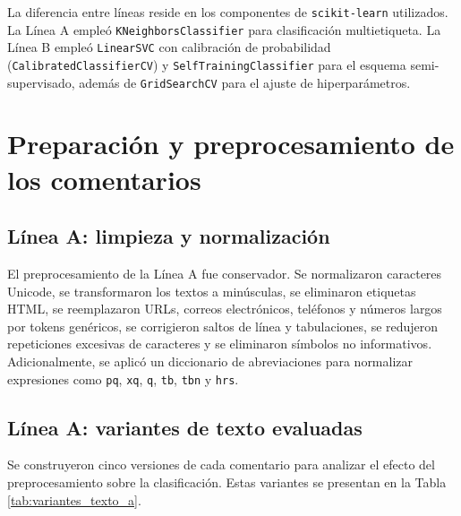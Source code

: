 \documentclass[12pt,a4paper]{article}
\newcommand{\code}[1]{\nolinkurl{#1}}
\begin{document}
La diferencia entre líneas reside en los componentes de \code{scikit-learn} utilizados. La Línea A empleó \code{KNeighborsClassifier} para clasificación multietiqueta. La Línea B empleó \code{LinearSVC} con calibración de probabilidad (\code{CalibratedClassifierCV}) y \code{SelfTrainingClassifier} para el esquema semi-supervisado, además de \code{GridSearchCV} para el ajuste de hiperparámetros.

\section{Preparación y preprocesamiento de los comentarios}

\subsection{Línea A: limpieza y normalización}

El preprocesamiento de la Línea A fue conservador. Se normalizaron caracteres Unicode, se transformaron los textos a minúsculas, se eliminaron etiquetas HTML, se reemplazaron URLs, correos electrónicos, teléfonos y números largos por tokens genéricos, se corrigieron saltos de línea y tabulaciones, se redujeron repeticiones excesivas de caracteres y se eliminaron símbolos no informativos. Adicionalmente, se aplicó un diccionario de abreviaciones para normalizar expresiones como \code{pq}, \code{xq}, \code{q}, \code{tb}, \code{tbn} y \code{hrs}.

\subsection{Línea A: variantes de texto evaluadas}

Se construyeron cinco versiones de cada comentario para analizar el efecto del preprocesamiento sobre la clasificación. Estas variantes se presentan en la Tabla \ref{tab:variantes_texto_a}.
\end{document}
